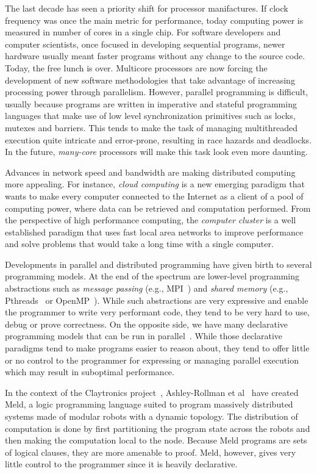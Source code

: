 
The last decade has seen a priority shift for processor manifactures. If clock frequency
was once the main metric for performance, today computing power is measured in number of
cores in a single chip.
For software developers and computer scientists, once focused in developing sequential programs,
newer hardware usually meant faster programs without any change to the source code. Today,
the free lunch is over. Multicore processors are now forcing the development of
new software methodologies that take advantage of increasing processing power through parallelism.
However, parallel programming is difficult, usually because programs are written
in imperative and stateful programming languages that make use of low level synchronization
primitives such as locks, mutexes and barriers. This tends to make the task of managing multithreaded
execution quite intricate and error-prone, resulting in race hazards and deadlocks.
In the future, \emph{many-core} processors will make this task look even more daunting.

Advances in network speed and bandwidth are making distributed computing
more appealing. For instance, \emph{cloud computing} is a new emerging paradigm that wants
to make every computer connected to the Internet as a client of a pool of computing power,
where data can be retrieved and computation performed. From the perspective of high performance
computing, the \emph{computer cluster} is a well established paradigm that uses fast local area
networks to improve performance and solve problems that would take a long time with a single computer.

Developments in parallel and distributed programming have given birth to several programming models.
At the end of the spectrum are lower-level programming abstractions such as
\emph{message passing} (e.g., MPI~\cite{gabriel04-open-mpi}) and \emph{shared memory}
(e.g., Pthreads~\cite{Butenhof:1997:PPT:263953} or OpenMP~\cite{Chapman-2007-UOP-1370966}).
While such abstractions are very expressive and enable the programmer to write very performant code,
they tend to be very hard to use, debug or prove correctness.
On the opposite side, we have many declarative programming models
that can be run in parallel~\cite{Blelloch:1996:PPA:227234.227246}.
While those declarative paradigms tend to make programs easier to reason about, they tend to offer
little or no control to the programmer for expressing or managing parallel execution
which may result in suboptimal performance.

In the context of the Claytronics project~\cite{goldstein-computer05}, Ashley-Rollman et al~\cite{ashley-rollman-iclp09, ashley-rollman-derosa-iros07wksp} have created
Meld, a logic programming language suited to program massively distributed systems made of modular robots
with a dynamic topology. The distribution of computation is done by first partitioning the program
state across the robots and then making the computation local to the node. Because Meld programs
are sets of logical clauses, they are more amenable to proof. Meld, however, gives very little control
to the programmer since it is heavily declarative.

